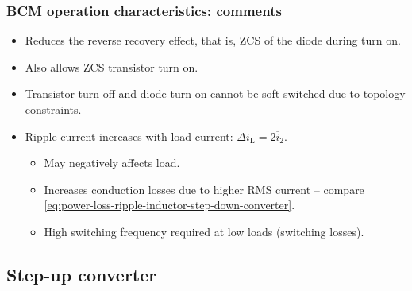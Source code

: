 \begin{frame}
    \frametitle{BCM operation characteristics: comments}
   \begin{itemize}
        \item<1-> Reduces the reverse recovery effect, that is, ZCS of the diode during turn on.
        \item<2-> Also allows ZCS transistor turn on.  
   \end{itemize}
   \vspace{1em}
    \begin{itemize}
          \item<3-> Transistor turn off and diode turn on cannot be soft switched due to topology constraints.
          \item<4-> Ripple current increases with load current: $ \Delta i_\mathrm{L} = 2\overline{i}_2$.
          \begin{itemize}
            \item May negatively affects load.
            \item Increases conduction losses due to higher RMS current -- compare \eqref{eq:power-loss-ripple-inductor-step-down-converter}.
            \item High switching frequency required at low loads (switching losses).
          \end{itemize}
    \end{itemize}
\end{frame}

\subsection{Step-up converter}


